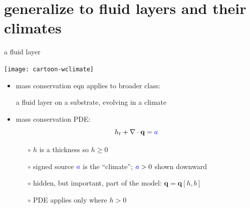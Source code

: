 \documentclass[xcolor={dvipsnames}]{beamer}
\newcommand\bq{\mathbf{q}}
\newcommand\Div{\nabla\cdot}
\begin{document}

\section{generalize to fluid layers and their climates}

\begin{frame}{a fluid layer}

\begin{center}
\texttt{[image: cartoon-wclimate]}
\end{center}

\vspace{-7mm}
\begin{itemize}
\item mass conservation eqn applies to broader class:
  \begin{center}
  \alert{a fluid layer on a substrate, evolving in a climate}
  \end{center}
\item mass conservation PDE:
\begin{equation*}
h_t + \Div\bq = {\color{blue} a}
\end{equation*}
    \begin{itemize}
    \vspace{-4mm}
    \item[$\circ$] $h$ is a thickness so $h\ge 0$
    \item[$\circ$] signed source ${\color{blue} a}$ is the ``climate''; ${\color{blue} a}>0$ shown downward
    \item[$\circ$] hidden, but important, part of the model: $\bq=\bq[h,b]$
    \item[$\circ$] \alert{PDE applies only where $h>0$}
    \end{itemize}
\end{itemize}
\end{frame}
\end{document}
